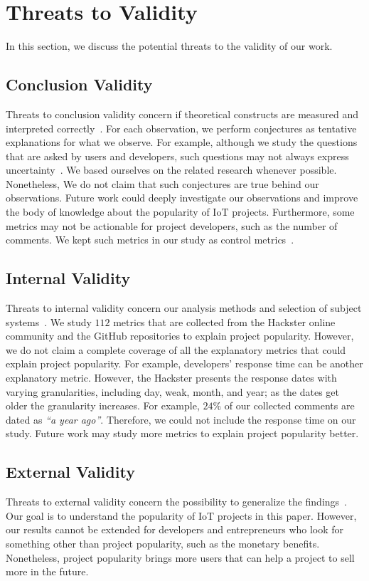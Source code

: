 \section{Threats to Validity}\label{section:threats}
\begin{comment}
\end{comment}

In this section, we discuss the potential threats to the validity of our work.

\subsection{Conclusion Validity}

Threats to conclusion validity concern if theoretical constructs are
measured and interpreted correctly~\cite{Shull:2007:GAE:1324786}.  For each
observation, we perform conjectures as tentative explanations for what we
observe. For example, although we study the questions that are asked by users
and developers, such questions may not always express
uncertainty~\cite{ebert2017confusion}. We based ourselves on the related
research whenever possible.  Nonetheless, We do not claim that such conjectures
are true behind our observations. Future work could deeply investigate our
observations and improve the body of knowledge about the popularity of IoT
projects. Furthermore, some metrics may not be actionable for project
developers, such as the number of comments. We kept such metrics in our study
as control metrics~\cite{noru2012ibm}.

\subsection{Internal Validity}
Threats to internal validity concern our analysis methods and
selection of subject systems~\cite{Shull:2007:GAE:1324786}.  We study $112$
metrics that are collected from the Hackster online community and the GitHub
repositories to explain project popularity. However, we do not claim a complete
coverage of all the explanatory metrics that could explain project popularity.
For example, developers' response time can be another explanatory metric.
However, the Hackster presents the response dates with varying granularities,
including day, weak, month, and year; as the dates get older the granularity
increases. For example, $24\%$ of our collected comments are dated as
\textit{``a year ago''}. Therefore, we could not include the response time on
our study.  Future work may study more metrics to explain project popularity
better. 

\subsection{External Validity}

Threats to external validity concern the possibility to generalize the
findings~\cite{Shull:2007:GAE:1324786}. Our goal is to understand the
popularity of IoT projects in this paper. However, our results cannot be
extended for developers and entrepreneurs who look for something other than
project popularity, such as the monetary benefits. Nonetheless, project
popularity brings more users that can help a project to sell more in the
future.

